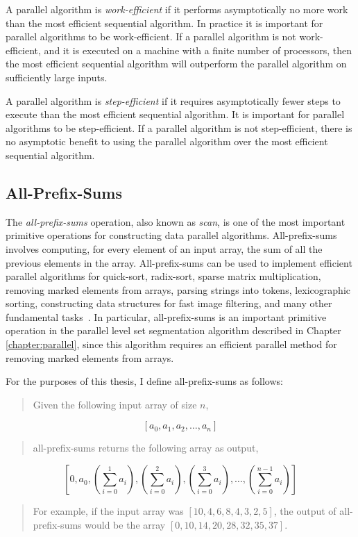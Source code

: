 A parallel algorithm is \emph{work-efficient} if it performs asymptotically no more work than the most efficient sequential algorithm. In practice it is important for parallel algorithms to be work-efficient. If a parallel algorithm is not work-efficient, and it is executed on a machine with a finite number of processors, then the most efficient sequential algorithm will outperform the parallel algorithm on sufficiently large inputs.~\cite{Atallah-1998}

A parallel algorithm is \emph{step-efficient} if it requires asymptotically fewer steps to execute than the most efficient sequential algorithm. It is important for parallel algorithms to be step-efficient. If a parallel algorithm is not step-efficient, there is no asymptotic benefit to using the parallel algorithm over the most efficient sequential algorithm.

\subsection{All-Prefix-Sums}

The \emph{all-prefix-sums} operation, also known as \emph{scan}, is one of the most important primitive operations for constructing data parallel algorithms. All-prefix-sums involves computing, for every element of an input array, the sum of all the previous elements in the array. All-prefix-sums can be used to implement efficient parallel algorithms for quick-sort, radix-sort, sparse matrix multiplication, removing marked elements from arrays, parsing strings into tokens, lexicographic sorting, constructing data structures for fast image filtering, and many other fundamental tasks~\cite{Blelloch-1993,Hensley-2005}. In particular, all-prefix-sums is an important primitive operation in the parallel level set segmentation algorithm described in Chapter \ref{chapter:parallel}, since this algorithm requires an efficient parallel method for removing marked elements from arrays.

\begin{samepage}
For the purposes of this thesis, I define all-prefix-sums as follows:
\begin{quote}
Given the following input array of size $n$,
\end{quote}
\begin{equation}
\left[ a_0 , a_1 , a_2 , \ldots , a_n \right]
\end{equation}
\begin{quote}
all-prefix-sums returns the following array as output,
\end{quote}
\begin{equation}
\left[0,a_0,\left(\sum_{ i = 0 }^{ 1 } a_i\right),\left(\sum_{ i = 0 }^{ 2 } a_i\right),\left(\sum_{ i = 0 }^{ 3 } a_i\right),\ldots,\left(\sum_{ i = 0 }^{ n-1 } a_i\right)\right]
\end{equation}
\begin{quote}
For example, if the input array was $[10, 4, 6, 8, 4, 3, 2, 5]$, the output of all-prefix-sums would be the array $[0,10,14,20,28,32,35,37]$.
\end{quote}
\end{samepage}

